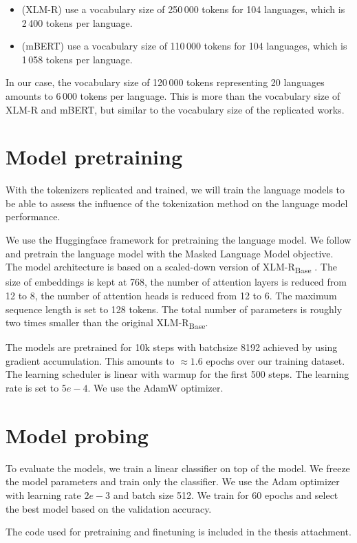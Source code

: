 \begin{itemize}
    \item \citet{conneau_unsupervised_2020-1} (XLM-R) use a vocabulary size of 250\,000 tokens for 104 languages, which is 2\,400 tokens per language.
    \item \citet{devlin_bert_2019} (mBERT) use a vocabulary size of 110\,000 tokens for 104 languages, which is 1\,058 tokens per language.
\end{itemize}

In our case, the vocabulary size of 120\,000 tokens representing 20 languages amounts to 6\,000 tokens per language. This is more than the vocabulary size of XLM-R and mBERT, but similar to the vocabulary size of the replicated works. 

\section{Model pretraining}
\label{sec:model_pretraining}

With the tokenizers replicated and trained, we will train the language models to be able to assess the influence of the tokenization method on the language model performance.

We use the Huggingface framework \cite{wolf_transformers_2020} for pretraining the language model. We follow \citet{conneau_unsupervised_2020} and pretrain the language model with the Masked Language Model objective. The model architecture is based on a scaled-down version of XLM-R\textsubscript{Base} \cite{conneau_unsupervised_2020}. The size of embeddings is kept at 768, the number of attention layers is reduced from 12 to 8, the number of attention heads is reduced from 12 to 6. The maximum sequence length is set to 128 tokens. The total number of parameters is roughly two times smaller than the original XLM-R\textsubscript{Base}.

The models are pretrained for 10k steps with batchsize 8192 achieved by using gradient accumulation. This amounts to $\approx 1.6$ epochs over our training dataset. The learning scheduler is linear with warmup for the first 500 steps. The learning rate is set to $5e-4$. We use the AdamW optimizer.

\section{Model probing}
\label{sec:model_probing}

To evaluate the models, we train a linear classifier on top of the model. We freeze the model parameters and train only the classifier. We use the Adam optimizer with learning rate $2e-3$ and batch size 512. We train for 60 epochs and select the best model based on the validation accuracy.

The code used for pretraining and finetuning is included in the thesis attachment.

